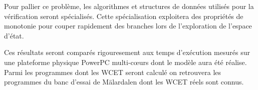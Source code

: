     \vspace{1em}


    Pour pallier ce problème, les algorithmes et structures de données utilisés
    pour la vérification seront spécialisés. Cette spécialisation exploitera
    des propriétés de monotonie pour couper rapidement des branches lors de
    l'exploration de l'espace d'état.

    Ces résultats seront comparés rigouresement aux temps d'exécution mesurés sur une
    plateforme physique PowerPC multi-c{\oe}urs dont le modèle aura été réalise.
    Parmi les programmes dont les WCET seront calculé on retrouvera les
    programmes du banc d'essai de Mälardalen \cite{GBA10} dont les WCET réels
    sont connus.  
